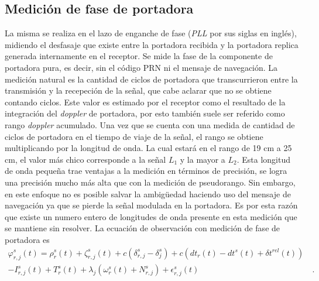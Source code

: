 \documentclass[a4paper,12pt,oneside,onecolumn,final,openright]{book}%
\begin{document}
\subsection{Medición de fase de portadora}%
	La misma se realiza en el lazo de enganche de fase (\textit{PLL} por sus siglas en inglés), midiendo el desfasaje que existe entre la portadora recibida y la portadora replica generada internamente en el receptor. Se mide la fase de la componente de portadora pura, es decir, sin el código PRN ni el mensaje de navegación. La medición natural es la cantidad de ciclos de portadora que transcurrieron entre la transmisión y la recepeción de la señal, que cabe aclarar que no se obtiene contando ciclos. Este valor es estimado por el receptor como el resultado de la integración del \textit{doppler} de portadora, por esto también suele ser referido como rango \textit{doppler} acumulado. Una vez que se cuenta con una medida de cantidad de ciclos de portadora en el tiempo de viaje de la señal, el rango se obtiene multiplicando por la longitud de onda. La cual estará en el rango de 19 cm a 25 cm, el valor más chico corresponde a la señal $L_1$ y la mayor a $L_2$. Esta longitud de onda pequeña trae ventajas a la medición en términos de precisión, se logra una precisión mucho más alta que con la medición de pseudorango. Sin embargo, en este enfoque no es posible salvar la ambigüedad haciendo uso del mensaje de navegación ya que se pierde la señal modulada en la portadora. Es por esta razón que existe un numero entero de longitudes de onda presente en esta medición que se mantiene sin resolver. La ecuación de observación con medición de fase de portadora es
\begin{align}\label{ec:obs_fasedep}
	\varphi _{r,j}^s(t) = \rho_r^s(t) + \zeta_{r,j}^s(t) + c\left( \delta_{r,j}^s - \delta_j^s \right) + c\left( dt_r(t) - dt^s(t) + \delta t^{rel}(t)\right) &\\ 
	- I_{r,j}^s(t) + T_r^s(t) + \lambda_j \left( \omega_r^s(t) + N_{r,j}^s \right) + \epsilon_{r,j}^s(t)& \ . \nonumber
\end{align}
\end{document}
